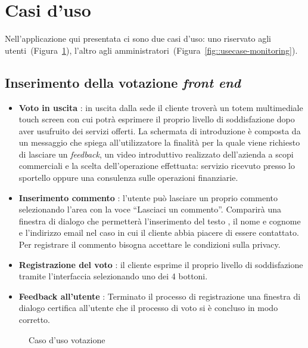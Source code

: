 \newpage
\section{Casi d'uso}
Nell'applicazione qui presentata ci sono due casi d'uso: uno riservato agli
utenti~(Figura~\ref{fig:usecase-voting}), l'altro agli
amministratori~(Figura~\ref{fig::usecase-monitoring}).
\subsection{Inserimento della votazione \emph{front end}}
\begin{itemize}
  \item \textbf{Voto in uscita} : in uscita dalla sede il cliente
  troverà un totem multimediale touch screen con cui potrà esprimere il
  proprio livello di soddisfazione dopo aver usufruito dei servizi offerti. La
  schermata di introduzione è composta da un messaggio che spiega
  all'utilizzatore la finalità per la quale viene richiesto di lasciare un
  \emph{feedback}, un video introduttivo realizzato dell'azienda a scopi
  commerciali e la scelta dell'operazione effettuata: servizio ricevuto presso
  lo sportello oppure una consulenza sulle operazioni finanziarie.
  \item \textbf{Inserimento commento} : l'utente può lasciare un proprio
  commento selezionando l'area con la voce ``Lasciaci un commento''. Comparirà
  una finestra di dialogo che permetterà l'inserimento del testo , il nome e
  cognome e l'indirizzo email nel caso in cui il cliente abbia piacere di essere
  contattato.
  Per registrare il commento bisogna accettare le condizioni sulla
  privacy.
  \item \textbf{Registrazione del voto} : il cliente esprime il proprio livello
  di soddisfazione tramite l’interfaccia selezionando uno dei 4 bottoni.
  \item \textbf{Feedback all'utente} : Terminato il processo di registrazione
  una finestra di dialogo certifica all'utente che il processo di voto si è
  concluso in modo corretto.
\end{itemize}

\begin{figure}[!h]
  \centering
  \caption{Caso d'uso votazione}
  \label{fig:usecase-voting}
\end{figure}

